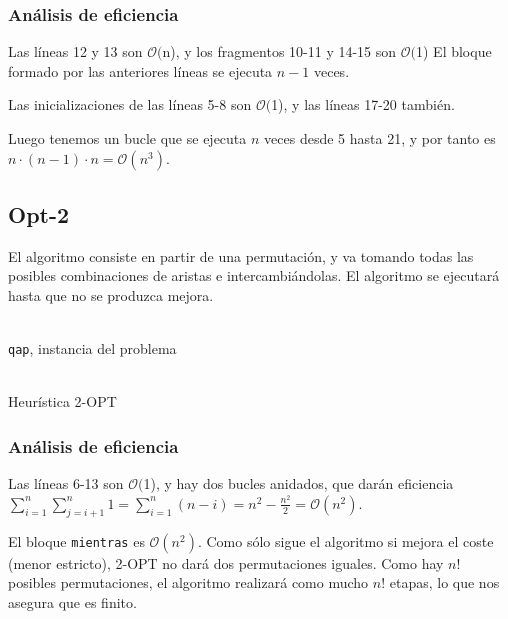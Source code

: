 \documentclass[a4paper, 11pt]{article} %
\newcommand{\ef}[1]{$\mathcal{O}#1$}
\begin{document}
\subsubsection{Análisis de eficiencia}
Las líneas 12 y 13 son \ef(n), y los fragmentos 10-11 y 14-15 son \ef(1)
El bloque formado por las anteriores líneas se ejecuta $n-1$ veces.

Las inicializaciones de las líneas 5-8 son \ef(1), y las líneas 17-20 también.

Luego tenemos un bucle que se ejecuta $n$ veces desde 5 hasta 21, y por tanto
es $n\cdot(n-1)\cdot n = \mathcal{O}(n^3)$.

\subsection{Opt-2}
El algoritmo consiste en partir de una permutación, y va tomando todas las posibles
combinaciones de aristas e intercambiándolas. El algoritmo se ejecutará
hasta que no se produzca mejora.
\begin{algorithm}[H]
	\begin{algorithmic}[1]
		\REQUIRE \ \\
        	\texttt{qap}, instancia del problema \\\
	      \STATE{\texttt{old\_cost=qap.cost}}
	      \ELSE
	      \ENDIF  
	  \ENDFOR
	\ENDFOR
	\ENDWHILE
	\end{algorithmic}
    \caption{Heurística 2-OPT}
    \label{opt2}
\end{algorithm}  

\subsubsection{Análisis de eficiencia}
Las líneas 6-13 son \ef(1), y hay dos bucles anidados, que darán eficiencia 
$\sum_{i=1}^{n} \sum_{j=i+1}^{n} 1 = \sum_{i=1}^{n} (n-i)= n^2-\frac{n^2}{2}=\mathcal{O}(n^2)$.

El bloque \texttt{mientras} es $\mathcal{O}(n^2)$. Como sólo sigue el algoritmo si mejora el
coste (menor estricto), 2-OPT no dará dos permutaciones iguales. Como hay $n!$ posibles
permutaciones, el algoritmo realizará como mucho $n!$ etapas, lo que nos asegura que es finito.
\end{document}
